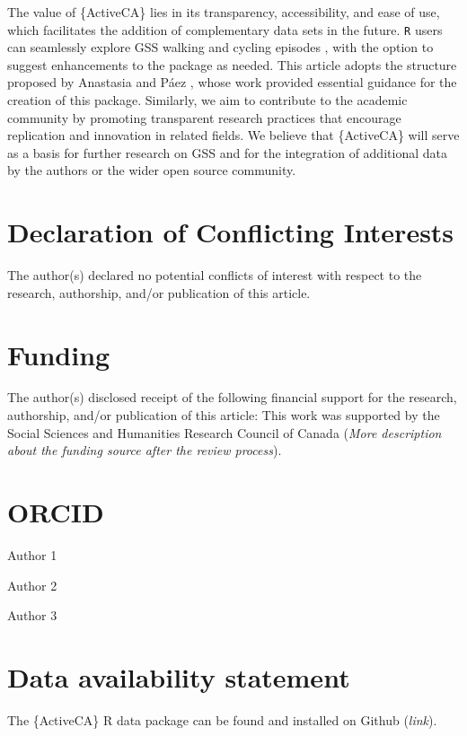 \documentclass[Royal,times,sageh]{sagej}
\begin{document}
The value of \{ActiveCA\} lies in its transparency, accessibility, and
ease of use, which facilitates the addition of complementary data sets
in the future. \texttt{R} users can seamlessly explore GSS walking and
cycling episodes , with the option to suggest enhancements to the
package as needed. This article adopts the structure proposed by
Anastasia and Páez \citeyearpar{soukhov2023}, whose work provided
essential guidance for the creation of this package. Similarly, we aim
to contribute to the academic community by promoting transparent
research practices that encourage replication and innovation in related
fields. We believe that \{ActiveCA\} will serve as a basis for further
research on GSS and for the integration of additional data by the
authors or the wider open source community.

\section{Declaration of Conflicting
Interests}\label{declaration-of-conflicting-interests}

The author(s) declared no potential conflicts of interest with respect
to the research, authorship, and/or publication of this article.

\section{Funding}\label{funding}

The author(s) disclosed receipt of the following financial support for
the research, authorship, and/or publication of this article: This work
was supported by the Social Sciences and Humanities Research Council of
Canada (\emph{More description about the funding source after the review
process}).

\section{ORCID}\label{orcid}

Author 1

Author 2

Author 3

\section{Data availability statement}\label{data-availability-statement}

The \{ActiveCA\} R data package can be found and installed on Github
(\emph{link}).



\end{document}
